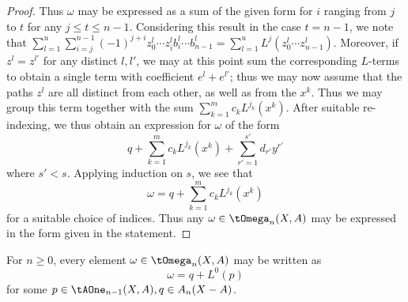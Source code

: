 \begin{proof}
Thus $\omega$ may be expressed as a sum of the given form for $i$ ranging from $j$ to $t$ for any $j \leq t \leq n-1$. Considering this result in the case $t = n-1$, we note that $\sum_{l=1}^u \sum_{i = j}^{n-1} (-1)^{j+i} z^l_0 \cdots z^l_i b^l_i \cdots b^l_{n-1} = \sum_{l=1}^u L^j(z^l_0 \cdots z^l_{n-1})$. Moreover, if $z^l = z^{l'}$ for any distinct $l, l'$, we may at this point sum the corresponding $L$-terms to obtain a single term with coefficient $e^l + e^{l'}$; thus we may now assume that the paths $z^l$ are all distinct from each other, as well as from the $x^k$. Thus we may group this term together with the sum $\sum_{k = 1}^m c_k L^{j_k}(x^k)$. After suitable re-indexing, we thus obtain an expression for $\omega$ of the form
\[
q + \sum_{k=1}^m c_k L^{j_k}(x^k) + \sum_{r' = 1}^{s'} d_{r'} y^{r'}
\]
where $s' < s$. Applying induction on $s$, we see that
\[
\omega = q + \sum_{k=1}^m c_k L^{j_k}(x^k)
\]
for a suitable choice of indices.
Thus any $\omega \in \tOmega_n(X,A)$ may be expressed in the form given in the statement.
\end{proof}

\begin{lemma}\label{iso-surjective}
For $n \geq 0$, every element $\omega \in \tOmega_n(X,A)$ may be written as
\[
\omega = q + L^0(p)
\]
for some $p \in \tAOne_{n-1}(X,A), q \in A_n(X-A)$.
\end{lemma}

